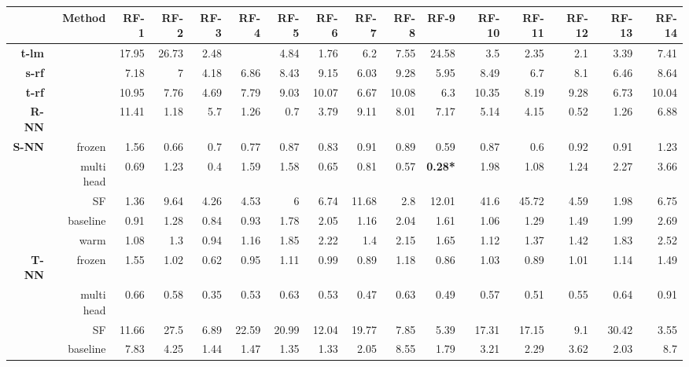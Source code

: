 \begin{table}
\begin{flushleft}
\begin{tabular}{rrrrrrrrrrrrrrrr}
 {} & {\textbf{Method}} & {\textbf{RF-1}} & {\textbf{RF-2}} & {\textbf{RF-3}} & {\textbf{RF-4}} & {\textbf{RF-5}} & {\textbf{RF-6}} & {\textbf{RF-7}} & {\textbf{RF-8}} & {\textbf{RF-9}} & {\textbf{RF-10}} & {\textbf{RF-11}} & {\textbf{RF-12}} & {\textbf{RF-13}} & {\textbf{RF-14}} \\ 
  \hline
{\textbf{t-lm}} &  & 17.95 & 26.73 & 2.48 &  & 4.84 & 1.76 & 6.2 & 7.55 & 24.58 & 3.5 & 2.35 & 2.1 & 3.39 & 7.41 \\ 
   \hline
{\textbf{s-rf}} &  & 7.18 & 7 & 4.18 & 6.86 & 8.43 & 9.15 & 6.03 & 9.28 & 5.95 & 8.49 & 6.7 & 8.1 & 6.46 & 8.64 \\ 
   \hline
{\textbf{t-rf}} &  & 10.95 & 7.76 & 4.69 & 7.79 & 9.03 & 10.07 & 6.67 & 10.08 & 6.3 & 10.35 & 8.19 & 9.28 & 6.73 & 10.04 \\ 
   \hline
{\textbf{R-NN}} &  & 11.41 & 1.18 & 5.7 & 1.26 & 0.7 & 3.79 & 9.11 & 8.01 & 7.17 & 5.14 & 4.15 & 0.52 & 1.26 & 6.88 \\ 
   \hline
{\textbf{S-NN}} & frozen & 1.56 & 0.66 & 0.7 & 0.77 & 0.87 & 0.83 & 0.91 & 0.89 & 0.59 & 0.87 & 0.6 & 0.92 & 0.91 & 1.23 \\ 
   & multi head & 0.69 & 1.23 & 0.4 & 1.59 & 1.58 & 0.65 & 0.81 & 0.57 & {\textbf{0.28*}} & 1.98 & 1.08 & 1.24 & 2.27 & 3.66 \\ 
   & SF & 1.36 & 9.64 & 4.26 & 4.53 & 6 & 6.74 & 11.68 & 2.8 & 12.01 & 41.6 & 45.72 & 4.59 & 1.98 & 6.75 \\ 
   & baseline & 0.91 & 1.28 & 0.84 & 0.93 & 1.78 & 2.05 & 1.16 & 2.04 & 1.61 & 1.06 & 1.29 & 1.49 & 1.99 & 2.69 \\ 
   & warm & 1.08 & 1.3 & 0.94 & 1.16 & 1.85 & 2.22 & 1.4 & 2.15 & 1.65 & 1.12 & 1.37 & 1.42 & 1.83 & 2.52 \\ 
   \hline
{\textbf{T-NN}} & frozen & 1.55 & 1.02 & 0.62 & 0.95 & 1.11 & 0.99 & 0.89 & 1.18 & 0.86 & 1.03 & 0.89 & 1.01 & 1.14 & 1.49 \\ 
   & multi head & 0.66 & 0.58 & 0.35 & 0.53 & 0.63 & 0.53 & 0.47 & 0.63 & 0.49 & 0.57 & 0.51 & 0.55 & 0.64 & 0.91 \\ 
   & SF & 11.66 & 27.5 & 6.89 & 22.59 & 20.99 & 12.04 & 19.77 & 7.85 & 5.39 & 17.31 & 17.15 & 9.1 & 30.42 & 3.55 \\ 
   & baseline & 7.83 & 4.25 & 1.44 & 1.47 & 1.35 & 1.33 & 2.05 & 8.55 & 1.79 & 3.21 & 2.29 & 3.62 & 2.03 & 8.7 \\ 

\end{tabular}
\end{flushleft}
\end{table}
